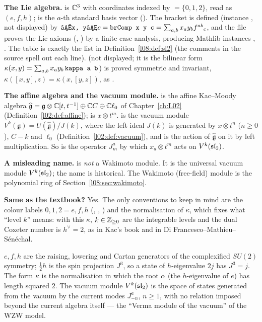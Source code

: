 \begin{dictionary}
\textbf{The Lie algebra.}  is ${\mathbb{C}}^3$ with coordinates indexed by
 $=\{0,1,2\}$, read as $(e,f,h)$;  is the $a$-th standard basis vector
(). The bracket is defined (instance , not displayed) by
$\lean{⁅x, y⁆} c = \lean{brComp x y c} = \sum_{a,b}x_ay_bf^{ab}{}_c$, and the file proves the Lie
axioms (, ) by a finite case analysis, producing Mathlib
instances , . The table  is exactly the list in
Definition~\ref{l08:def:sl2} (the comments in the source spell out each line). 
(not displayed; it is the bilinear form $\kappa(x,y)=\sum_{a,b}x_ay_b\,\lean{kappa a b}$) is proved
symmetric and invariant, $\kappa([x,y],z) = \kappa(x,[y,z])$, as .

\textbf{The affine algebra and the vacuum module.}  is the affine Kac--Moody
algebra $\widehat{\mathfrak g} = \mathfrak g\otimes{\mathbb{C}}[t,t^{-1}]\oplus{\mathbb{C}} C\oplus{\mathbb{C}}\ell_0$ of
Chapter~\ref{ch:L02} (Definition~\ref{l02:def:affine});  is $x\otimes t^m$.
 is the vacuum module $V^k(\mathfrak g) = U(\widehat{\mathfrak g})/J(k)$, where
the left ideal $J(k)$ is generated by $x\otimes t^n$ ($n\ge0$), $C-k$ and $\ell_0$
(Definition~\ref{l02:def:vacuum}), and  is the action of $\widehat{\mathfrak g}$ on it
by left multiplication. So  is the operator $J^a_m$ by which $x_a\otimes t^m$ acts on
$V^k(\mathfrak{sl}_2)$.

\textbf{A misleading name.}  is \emph{not} a Wakimoto module. It is the universal
vacuum module $V^k(\mathfrak{sl}_2)$; the name is historical. The Wakimoto (free-field) module is the
polynomial ring  of Section~\ref{l08:sec:wakimoto}.

\textbf{Same as the textbook?} Yes. The only conventions to keep in mind are the colour labels
$0,1,2 = e,f,h$ (, , ) and the normalisation of $\kappa$, which
fixes what ``level $k$'' means: with this $\kappa$, $k\in{\mathbb{Z}}_{\ge0}$ are the integrable levels and the
dual Coxeter number is $h^\vee=2$, as in Kac's book and in Di Francesco--Mathieu--S\'en\'echal.
\end{dictionary}

\begin{physics}
$e,f,h$ are the raising, lowering and Cartan generators of the complexified $SU(2)$ symmetry;
$\frac12h$ is the spin projection $J^3$, so a state of $h$-eigenvalue $2j$ has $J^3=j$. The form
$\kappa$ is the normalisation in which the root $\alpha$ (the $h$-eigenvalue of $e$) has length
squared $2$. The
vacuum module $V^k(\mathfrak{sl}_2)$ is the space of states generated from the vacuum by the current modes
$J^a_{-n}$, $n\ge1$, with no relation imposed beyond the current algebra itself --- the ``Verma
module of the vacuum'' of the WZW model.
\end{physics}

